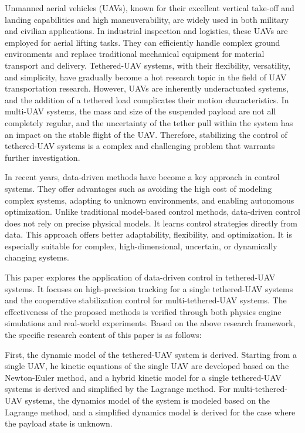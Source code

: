 \documentclass[lang=chs, degree=master, blindreview=true, winfonts=true]{yanputhesis}
\begin{document}
\begin{engabstract}                                         
	Unmanned aerial vehicles (UAVs), known for their excellent vertical take-off and landing capabilities and high maneuverability, are widely used in both military and civilian applications. In industrial inspection and logistics, these UAVs are employed for aerial lifting tasks. They can efficiently handle complex ground environments and replace traditional mechanical equipment for material transport and delivery. Tethered-UAV systems, with their flexibility, versatility, and simplicity, have gradually become a hot research topic in the field of UAV transportation research. However, UAVs are inherently underactuated systems, and the addition of a tethered load complicates their motion characteristics. In multi-UAV systems, the mass and size of the suspended payload are not all completely regular, and the uncertainty of the tether pull within the system has an impact on the stable flight of the UAV. Therefore, stabilizing the control of tethered-UAV systems is a complex and challenging problem that warrants further investigation.
		
	In recent years, data-driven methods have become a key approach in control systems. They offer advantages such as avoiding the high cost of modeling complex systems, adapting to unknown environments, and enabling autonomous optimization. Unlike traditional model-based control methods, data-driven control does not rely on precise physical models. It learns control strategies directly from data. This approach offers better adaptability, flexibility, and optimization. It is especially suitable for complex, high-dimensional, uncertain, or dynamically changing systems.
	
	This paper explores the application of data-driven control in tethered-UAV systems. It focuses on high-precision tracking for a single tethered-UAV systems and the cooperative stabilization control for multi-tethered-UAV systems. The effectiveness of the proposed methods is verified through both physics engine simulations and real-world experiments. Based on the above research framework, the specific research content of this paper is as follows:
	
	First, the dynamic model of the tethered-UAV system is derived. Starting from a single UAV, he kinetic equations of the single UAV are developed based on the Newton-Euler method, and a hybrid kinetic model for a single tethered-UAV systems is derived and simplified by the Lagrange method. For multi-tethered-UAV systems, the dynamics model of the system is modeled based on the Lagrange method, and a simplified dynamics model is derived for the case where the payload state is unknown.
	

\end{engabstract}
\end{document}
